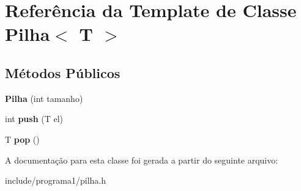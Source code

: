 \hypertarget{class_pilha}{}\section{Referência da Template de Classe Pilha$<$ T $>$}
\label{class_pilha}
\subsection*{Métodos Públicos}
\begin{DoxyCompactItemize}
\item 
\mbox{\label{class_pilha_a60057159bd83066106292ab3a2a5323b}} 
{\bfseries Pilha} (int tamanho)
\item 
\mbox{\label{class_pilha_af22649447fbad79f92328e6540415490}} 
int {\bfseries push} (T el)
\item 
\mbox{\label{class_pilha_a7dfe994c50f9acee11725ce9eace528e}} 
T {\bfseries pop} ()
\end{DoxyCompactItemize}


A documentação para esta classe foi gerada a partir do seguinte arquivo\+:\begin{DoxyCompactItemize}
\item 
include/programa1/pilha.\+h\end{DoxyCompactItemize}
